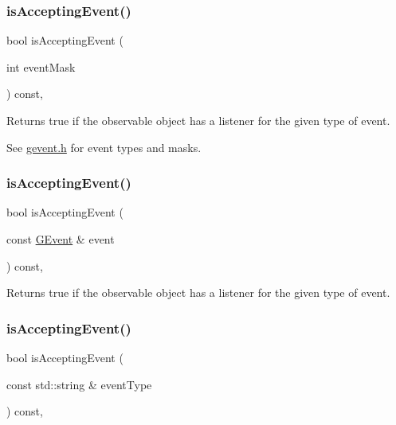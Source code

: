 \subsubsection{\texorpdfstring{is\+Accepting\+Event()}{isAcceptingEvent()}\hspace{0.1cm}{\footnotesize\ttfamily [1/3]}}
{\footnotesize\ttfamily bool is\+Accepting\+Event (\begin{DoxyParamCaption}\item[{int}]{event\+Mask }\end{DoxyParamCaption}) const\hspace{0.3cm}{\ttfamily [protected]}, {\ttfamily [virtual]}}



Returns true if the observable object has a listener for the given type of event. 

See \mbox{\hyperlink{gevent_8h_source}{gevent.\+h}} for event types and masks. \mbox{\label{classGObservable_aa31c73145a29dcb92848a92e0cfaea41}} 
\subsubsection{\texorpdfstring{is\+Accepting\+Event()}{isAcceptingEvent()}\hspace{0.1cm}{\footnotesize\ttfamily [2/3]}}
{\footnotesize\ttfamily bool is\+Accepting\+Event (\begin{DoxyParamCaption}\item[{const \mbox{\hyperlink{classGEvent}{G\+Event}} \&}]{event }\end{DoxyParamCaption}) const\hspace{0.3cm}{\ttfamily [protected]}, {\ttfamily [virtual]}}



Returns true if the observable object has a listener for the given type of event. 

\mbox{\label{classGObservable_a3b1c689267eda44e65a2213e7de38b23}} 
\subsubsection{\texorpdfstring{is\+Accepting\+Event()}{isAcceptingEvent()}\hspace{0.1cm}{\footnotesize\ttfamily [3/3]}}
{\footnotesize\ttfamily bool is\+Accepting\+Event (\begin{DoxyParamCaption}\item[{const std\+::string \&}]{event\+Type }\end{DoxyParamCaption}) const\hspace{0.3cm}{\ttfamily [protected]}, {\ttfamily [virtual]}}



